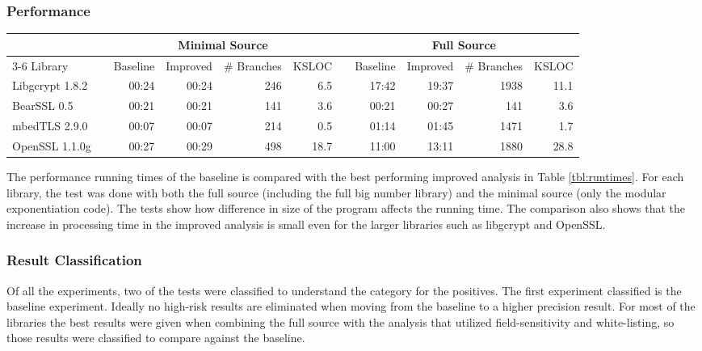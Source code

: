 \subsubsection{Performance}

\begin{table*}[!t]
  \centering
  \begin{tabular}{@{}lcrrrrcrrrr@{}}
    \toprule
     & & \multicolumn{4}{c}{Minimal Source} & &  \multicolumn{4}{c}{Full Source} \\
    \cmidrule{3-6} \cmidrule{8-11}
    Library&& Baseline & Improved & \# Branches & KSLOC && Baseline & Improved & \# Branches & KSLOC\\
    \midrule
    Libgcrypt 1.8.2 && 00:24 & 00:24 & 246 & 6.5 &&  17:42 & 19:37 & 1938 & 11.1\\
    BearSSL 0.5 && 00:21 & 00:21 & 141  & 3.6 && 00:21 & 00:27  & 141 & 3.6\\
    mbedTLS 2.9.0 && 00:07 & 00:07& 214 & 0.5 && 01:14 & 01:45  & 1471 & 1.7\\
    OpenSSL 1.1.0g && 00:27 & 00:29& 498 & 18.7 && 11:00 & 13:11 & 1880 & 28.8\\
    \bottomrule
  \end{tabular}
\caption{Baseline and Improved Analysis Run Time (mm:ss)}
\label{tbl:runtimes}
\end{table*}



The performance running times of the baseline is compared with the best
performing improved analysis in Table \ref{tbl:runtimes}. For each library, the
test was done with both the full source (including the full big number library)
and the minimal source (only the modular exponentiation code). The
tests show how difference in size of the program affects the running time. The comparison
also shows that the increase in processing time in the improved analysis is
small even for the larger libraries such as libgcrypt and OpenSSL.

\subsubsection{Result Classification}
 Of all the experiments, two of the tests were classified to understand the
 category for the positives. The first experiment classified is the baseline
 experiment. Ideally no high-risk results are eliminated when moving from the
 baseline to a higher precision result. For most of the libraries the best
 results were given when combining the full source with the analysis that
 utilized field-sensitivity and white-listing, so those results were classified
 to compare against the baseline.

